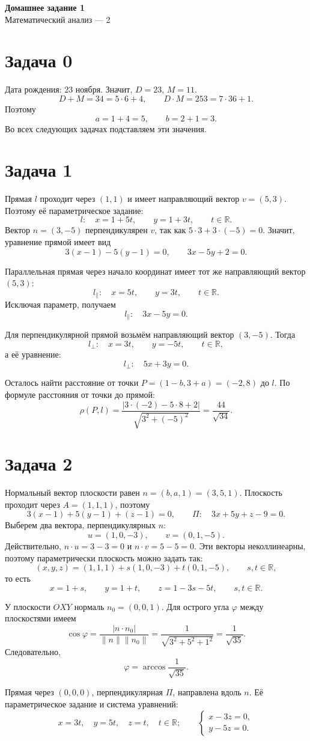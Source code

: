 \documentclass[12pt,a4paper]{article}
\newcommand{\R}{\mathbb R}
\newcommand{\task}[1]{\section*{Задача #1}}
\begin{document}
\begin{center}
    {\Large\bfseries Домашнее задание 1}\\[4pt]
    Математический анализ --- 2
\end{center}

\task{0}
Дата рождения: 23 ноября. Значит, $D=23$, $M=11$.
\[
D+M=34=5\cdot6+4,\qquad D\cdot M=253=7\cdot36+1.
\]
Поэтому
\[
\boxed{a=1+4=5,\qquad b=2+1=3.}
\]
Во всех следующих задачах подставляем эти значения.

\task{1}
Прямая $l$ проходит через $(1,1)$ и имеет направляющий вектор
$v=(5,3)$. Поэтому её параметрическое задание:
\[
\boxed{l:\quad x=1+5t,\qquad y=1+3t,\qquad t\in\R.}
\]
Вектор $n=(3,-5)$ перпендикулярен $v$, так как
$5\cdot3+3\cdot(-5)=0$. Значит, уравнение прямой имеет вид
\[
3(x-1)-5(y-1)=0,
\qquad\boxed{3x-5y+2=0.}
\]

Параллельная прямая через начало координат имеет тот же
направляющий вектор $(5,3)$:
\[
\boxed{l_{\parallel}:\quad x=5t,\qquad y=3t,\qquad t\in\R.}
\]
Исключая параметр, получаем
\[
\boxed{l_{\parallel}:\quad 3x-5y=0.}
\]

Для перпендикулярной прямой возьмём направляющий вектор $(3,-5)$.
Тогда
\[
\boxed{l_{\perp}:\quad x=3t,\qquad y=-5t,\qquad t\in\R,}
\]
а её уравнение:
\[
\boxed{l_{\perp}:\quad 5x+3y=0.}
\]

Осталось найти расстояние от точки
$P=(1-b,3+a)=(-2,8)$ до $l$. По формуле расстояния от точки
до прямой:
\[
\rho(P,l)=\frac{|3\cdot(-2)-5\cdot8+2|}{\sqrt{3^2+(-5)^2}}
=\boxed{\frac{44}{\sqrt{34}}}.
\]

\newpage
\task{2}
Нормальный вектор плоскости равен $n=(b,a,1)=(3,5,1)$.
Плоскость проходит через $A=(1,1,1)$, поэтому
\[
3(x-1)+5(y-1)+(z-1)=0,
\qquad\boxed{\Pi:\quad 3x+5y+z-9=0.}
\]
Выберем два вектора, перпендикулярных $n$:
\[
u=(1,0,-3),\qquad v=(0,1,-5).
\]
Действительно, $n\cdot u=3-3=0$ и $n\cdot v=5-5=0$.
Эти векторы неколлинеарны, поэтому параметрически плоскость
можно задать так:
\[
(x,y,z)=(1,1,1)+s(1,0,-3)+t(0,1,-5),\qquad s,t\in\R,
\]
то есть
\[
\boxed{x=1+s,\qquad y=1+t,\qquad z=1-3s-5t,\qquad s,t\in\R.}
\]

У плоскости $OXY$ нормаль $n_0=(0,0,1)$. Для острого угла
$\varphi$ между плоскостями имеем
\[
\cos\varphi=\frac{|n\cdot n_0|}{\lVert n\rVert\lVert n_0\rVert}
=\frac{1}{\sqrt{3^2+5^2+1^2}}=\frac{1}{\sqrt{35}}.
\]
Следовательно,
\[
\boxed{\varphi=\arccos\frac{1}{\sqrt{35}}.}
\]

Прямая через $(0,0,0)$, перпендикулярная $\Pi$, направлена вдоль $n$.
Её параметрическое задание и система уравнений:
\[
\boxed{x=3t,\quad y=5t,\quad z=t,\quad t\in\R;}
\qquad
\boxed{\begin{cases}x-3z=0,\\y-5z=0.\end{cases}}
\]
\end{document}
